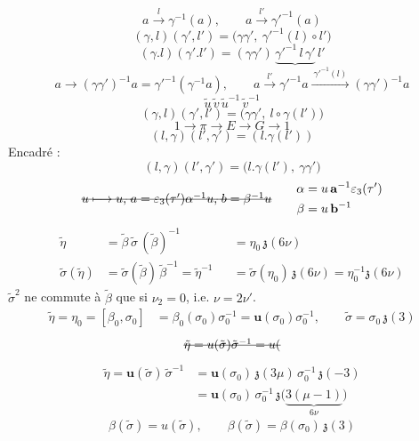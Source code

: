 \documentclass[11pt,a4paper]{article}
\begin{document}
\[
a \xrightarrow{\ l\ } \gamma^{-1}(a), \qquad a \xrightarrow{\ l'\ } \gamma'^{-1}(a)
\]
\[
(\gamma, l)(\gamma', l') = \bigl(\gamma\gamma', \ \gamma'^{-1}(l) \circ l'\bigr)
\]
\[
(\gamma . l)(\gamma' . l') = (\gamma\gamma')\,\underbrace{\gamma'^{-1}\, l\, \gamma'}\, l'
\]
\[
a \longrightarrow (\gamma\gamma')^{-1}a = \gamma'^{-1}(\gamma^{-1}a), \qquad
a \xrightarrow{\ l'\ } \gamma'^{-1}a \xrightarrow{\ \gamma'^{-1}(l)\ } (\gamma\gamma')^{-1}a
\]
\[
\tilde u\,\tilde v\,\tilde u^{-1}\,\tilde v^{-1}
\]
\[
(\gamma, l)(\gamma', l') = \bigl(\gamma\gamma', \ l \circ \gamma(l')\bigr)
\]
\[
1 \longrightarrow \pi \longrightarrow E \longrightarrow G \longrightarrow 1
\]
\[
(l, \gamma)(l', \gamma') = (l . \gamma(l'))
\]
Encadré :
\[
(l, \gamma)(l', \gamma') = \bigl(l . \gamma(l'), \ \gamma\gamma'\bigr)
\]
\[
\text{\struck{$u \longmapsto u$, $a = \varepsilon_3(\tau')\alpha^{-1}u$, $b = \beta^{-1}u$}}
\qquad
\begin{aligned}
\alpha &= u\,\mathbf{a}^{-1}\varepsilon_3(\tau') \\
\beta &= u\,\mathbf{b}^{-1}
\end{aligned}
\]
\[
\begin{aligned}
\tilde\eta &= \tilde\beta\,\tilde\sigma\,(\tilde\beta)^{-1} &&= \eta_0\,\mathfrak{z}(6\nu) \\
\tilde\sigma(\tilde\eta) &= \tilde\sigma(\tilde\beta)\,\tilde\beta^{-1} = \tilde\eta^{-1} &&= \tilde\sigma(\eta_0)\,\mathfrak{z}(6\nu) = \eta_0^{-1}\mathfrak{z}(6\nu)
\end{aligned}
\]
$\tilde\sigma^2$ ne commute à $\tilde\beta$ que si $\nu_2 = 0$, i.e. $\nu = 2\nu'$.
\[
\begin{aligned}
\tilde\eta = \eta_0 = [\beta_0, \sigma_0] &= \beta_0(\sigma_0)\sigma_0^{-1} = \mathbf{u}(\sigma_0)\sigma_0^{-1}, \qquad \tilde\sigma = \sigma_0\,\mathfrak{z}(3)
\end{aligned}
\]
\[
\text{\struck{$\tilde\eta = u(\tilde\sigma)\tilde\sigma^{-1} = u($}}
\]
\[
\begin{aligned}
\tilde\eta = \mathbf{u}(\tilde\sigma)\,\tilde\sigma^{-1}
&= \mathbf{u}(\sigma_0)\,\mathfrak{z}(3\mu)\,\sigma_0^{-1}\,\mathfrak{z}(-3) \\
&= \mathbf{u}(\sigma_0)\,\sigma_0^{-1}\,\mathfrak{z}\bigl(\underbrace{3(\mu - 1)}_{6\nu}\bigr)
\end{aligned}
\]
\[
\beta(\tilde\sigma) = u(\tilde\sigma), \qquad \beta(\tilde\sigma) = \beta(\sigma_0)\,\mathfrak{z}(3)
\]
\end{document}

